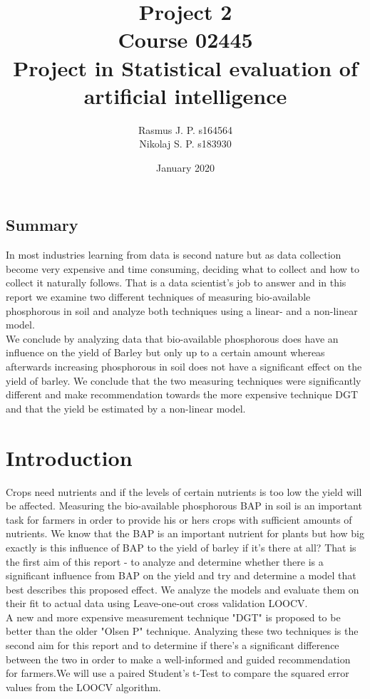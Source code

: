 \documentclass{article}
\begin{document}
\begin{titlepage}
	
	
	\title{Project 2 \\ Course 02445 \\ Project in Statistical evaluation of \\ artificial intelligence }
	\author{Rasmus J. P. s164564 \\ Nikolaj S. P. s183930}
	\date{January 2020}
	\maketitle
	
\subsection*{Summary}
In most industries learning from data is second nature but as data collection become very expensive and time consuming, deciding what to collect and how to collect it naturally follows. That is a data scientist's job to answer and in this report we examine two different techniques of measuring bio-available phosphorous in soil and analyze both techniques using a linear- and a non-linear model.\\ We conclude by analyzing data that bio-available phosphorous does have an influence on the yield of Barley but only up to a certain amount whereas afterwards increasing phosphorous in soil does not have a significant effect on the yield of barley. We conclude that the two measuring techniques were significantly different and make recommendation towards the more expensive technique DGT and that the yield be estimated by a non-linear model.
	
\end{titlepage}


\section{Introduction}
Crops need nutrients and if the levels of certain nutrients is too low the yield will be affected. Measuring the bio-available phosphorous BAP in soil is an important task for farmers in order to provide his or hers crops with sufficient amounts of nutrients. We know that the BAP is an important nutrient for plants but how big exactly is this influence of BAP to the yield of barley if it's there at all? That is the first aim of this report - to analyze and determine whether there is a significant influence from BAP on the yield and try and determine a model that best describes this proposed effect. We analyze the models and evaluate them on their fit to actual data using Leave-one-out cross validation LOOCV. \\ A new and more expensive measurement technique "DGT" is proposed to be better than the older "Olsen P" technique. Analyzing these two techniques is the second aim for this report and to determine if there's a significant difference between the two in order to make a well-informed and guided recommendation for farmers.We will use a paired Student's t-Test to compare the squared error values from the LOOCV algorithm.
\end{document}
